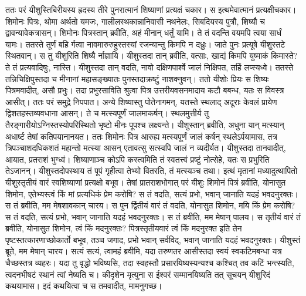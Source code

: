 \adhyAya
{}
\vakya ततः परं यीशुस्तिबिरीयस्य ह्रदस्य तीरे पुनरात्मानं शिष्याणां प्रत्यक्षं चकार। स इत्थमेवात्मानं प्रत्यक्षीचकार।
\vakya शिमोनः पित्रः, थोमा अर्थतो यमजः, गालीलस्थकान्नानिवासी नथनेलः, सिबदियस्य पुत्रौ, शिष्यौ च द्वावन्यावेकत्रासन्।
\vakya शिमोनः पित्रस्तान् ब्रवीति, अहं मीनान् धर्तुं यामि। ते तं वदन्ति वयमपि त्वया सार्धं यामः। ततस्ते तूर्णं बहि र्गत्वा नावमारुरुहुस्तस्यां रजन्यान्तु किमपि न दध्रुः।
\vakya जाते पुनः प्रत्यूषे यीशुस्तटे स्थितवान्। स तु यीशुरिति शिष्यै र्नाज्ञायि।
\vakya यीशुस्तदा तान् ब्रवीति, वत्साः, खाद्यं किमपि युष्माकं किमास्ते? ते तं प्रत्यवादिषुः, नास्ति।
\vakya यीशुस्तदा तान् वदति, नावो दक्षिणपार्श्वे जालं निक्षिपत, तर्हि लप्स्यध्वे। ततस्ते तन्निचिक्षिपुस्तदा च मीनानां महासङ्ख्यातः पुनस्तदाक्रष्टुं नाशक्नुवन्।
\vakya ततो यीशोः प्रियः स शिष्यः पित्रमवादीत्, असौ प्रभुः। तदा प्रभुरसाविति श्रुत्वा पित्र उत्तरीयवसनमादाय कटौ बबन्ध, यतः स विवस्त्र आसीत्। ततः परं समुद्रे निपपात।
\vakya अन्ये शिष्यास्तु पोतेनागमन्, यतस्ते स्थलाद् अदूराः केवलं प्रायेण द्विशतहस्तव्यवधाना आसन्। ते च मत्स्यपूर्णं जालमाकर्षन्।
\vakya स्थलमुत्तीर्य तु तैरङ्गारीयोऽग्निस्तस्योपरिस्थितो भृष्टो मीनः पूपश्च लक्ष्यन्ते।
\vakya यीशुस्तान् ब्रवीति, अधुना यान् मत्स्यान् अधार्ष्ट तेषां कतिपयानानयत।
\vakya ततः शिमोनः पित्र आरुह्य मत्स्यपूर्णं जालं कर्षन् स्थलेऽर्पयामास, तत्र त्रिपञ्चाशदधिकशतं महान्तो मत्स्या आसन् एतावत्सु सत्स्वपि जालं न व्यदीर्यत।
\vakya यीशुस्तदा तानवादीत्, आयात, प्रतराशं भुग्ध्वं। शिष्याणाञ्च कोऽपि कस्त्वमिति तं स्वतत्त्वं प्रष्टुं नोत्सेहे, यतः स प्रभुरिति तेऽजानन्।
\vakya यीशुस्तदोपस्थाय तं पूपं गृहीत्वा तेभ्यो वितरति, तं मत्स्यञ्च तथा।
\vakya इत्थं मृतानां मध्यादुत्थापितो यीशुस्तृतीयं वारं स्वशिष्याणां प्रत्यक्षो बभूव।
\vakya तेषां प्रातराशभोगात् परं यीशुः शिमोनं पित्रं ब्रवीति, योनासुत शिमोन, एतेभ्यस्त्वं किं मां प्रत्यधिकं प्रेम करोषि? स तं वदति, सत्यं प्रभो, भवान् जानाति यदहं भवदनुरक्तः। स तं ब्रवीति, मम मेषशावकान् चारय।
\vakya स पुन र्द्वितीयं वारं तं वदति, योनासुत शिमोन, मयि किं प्रेम करोषि? स तं वदति, सत्यं प्रभो, भवान् जानाति यदहं भवदनुरक्तः। स तं ब्रवीति, मम मेषान् पालय।
\vakya स तृतीयं वारं तं ब्रवीति, योनासुत शिमोन, त्वं किं मदनुरक्तः? पित्रस्तृतीयवारं त्वं किं मदनुरक्त इति तेन पृष्टस्तत्कारणाच्छोकार्तो बभूव, तञ्च जगाद, प्रभो भवान् सर्वविद्, भवान् जानाति यदहं भवदनुरक्तः। यीशुस्तं ब्रूते, मम मेषान् चारय।
\vakya सत्यं सत्यं, त्वामहं ब्रवीमि, यदा तरुणतर आसीस्तदा स्वयं स्वकटिमबन्धा यत्र चैच्छस्तत्र व्यहरः। यदा तु वृद्धो भविष्यसि, तदा स्वहस्तौ प्रसारयिष्यस्यन्यश्च कश्चित् तव कटिं भन्त्स्यति, त्वदनभीषटं स्थानं त्वां नेष्यति च।
\vakya कीदृशेन मृत्युना स ईश्वरं सम्मानयिष्यति तत् सूचयन् यीशुरिदं कथयामास। इदं कथयित्वा च स तमवादीत्, मामनुगच्छ।
